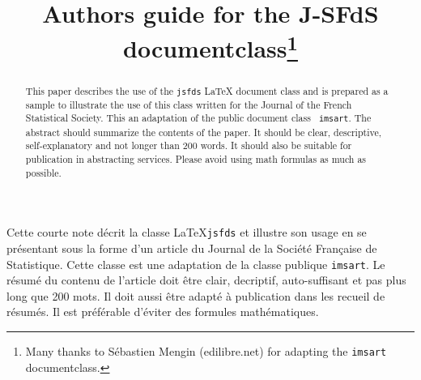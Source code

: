\documentclass[submission]{jsfds}
\begin{document}
\begin{frontmatter}

\title{Authors guide for the J-SFdS documentclass\thanks{Many thanks to Sébastien Mengin (edilibre.net) for adapting the \texttt{imsart} documentclass.}}


\begin{abstract}
This paper describes the use of the \texttt{jsfds} \LaTeX{} document class and is prepared as a sample
to illustrate the use of this class written for the Journal of the French Statistical Society. This an adaptation of the public document class \texttt{ imsart}. The abstract should summarize the contents of the paper. It should be clear, descriptive, self-explanatory and not longer than 200
words. It should also be suitable for publication in abstracting services.
Please avoid using math formulas as much as possible.
\end{abstract}


\begin{keywords}
\end{keywords}

\begin{altabstract}
Cette courte note décrit la classe \LaTeX \texttt{jsfds} et illustre son usage en se présentant sous la
forme d'un article du Journal de la Société Française de Statistique. Cette classe est une adaptation de la classe publique \texttt{imsart}. Le résumé du contenu de l'article doit être clair, decriptif, auto-suffisant et pas plus long que 200 mots. Il doit aussi être adapté à publication dans les recueil de résumés. Il est préférable d'éviter des formules mathématiques.
\end{altabstract}

\begin{altkeywords}
\end{altkeywords}

\begin{AMSclass}
\end{AMSclass}
\end{frontmatter}
\end{document}
